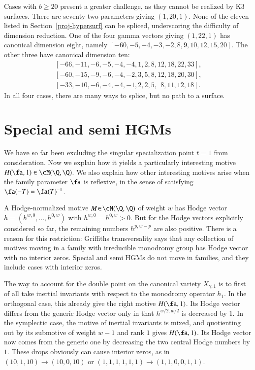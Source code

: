 \documentclass{notices}
\numberwithin{equation}{section}
\numberwithin{table}{section}
\numberwithin{figure}{section}
\begin{document}
{Cases with $b \geq 20$ present a greater 
challenge, as they cannot be realized by K3 surfaces. 
There are seventy-two parameters giving 
$(1,20,1)$.  None of the eleven 
listed in Section~\ref{proj-hypersurf} 
can be spliced, underscoring the
difficulty of dimension reduction.   
One of the four gamma vectors 
giving $(1,22,1)$ has canonical dimension
eight, namely $[-60, -5, -4, -3, -2, 8, 9, 10, 12, 15, 20]$.
The other three have canonical dimension
ten:
$$
\begin{array}{l}
\, [-66, -11, -6, -5, -4, -4, 1, 2, 8, 12, 18, 22, 33],\\
\,  [-60, -15, -9, -6, -4, -2, 3, 5, 8, 12, 18, 20, 30],\\
\, [-33, -10, -6, -4, -4, -1, 2, 2, 5, \; \, 8, 11, 12, 18].
\end{array}
$$
In all four cases, there are many ways to splice, but
no path to a surface.  





\section{Special and semi HGMs}
\label{special-motive}
We have so far been excluding the singular specialization point $t=1$ from consideration.
  Now we explain how it yields a particularly interesting 
  motive $H(\fa,1) \in \cM(\Q,\Q)$. 
We also explain how other interesting motives arise when the
family parameter $\fa$ is reflexive, in the sense of satisfying $\fa(-T)=\fa(T)^{-1}$.

 A Hodge-normalized motive $M \! \in \! \cM(\Q,\Q)$ of weight $w$
has Hodge vector $h = (h^{w,0},\dots,h^{0,w})$ with $h^{w,0}=h^{0,w}>0$.   
But for the Hodge vectors explicitly considered so far, the remaining
numbers $h^{p,w-p}$ are also positive.   There is a reason for this restriction: 
Griffiths transversality says that any collection of motives moving
in a family with irreducible monodromy group has Hodge vector with
no interior zeros.   Special and semi HGMs do not move in families,
and they include cases with interior zeros.  

  The way to account for the double point
on the canonical variety $X_{\gamma,1}$ is to first of all take
inertial invariants with respect to the monodromy operator 
$h_1$.  In the orthogonal case, this already give
the right motive $H(\fa,1)$.   Its Hodge vector
differs from the generic Hodge vector only in that
$h^{w/2,w/2}$ is decreased by $1$.   In the 
symplectic case, the motive of inertial invariants
is mixed, and quotienting out by its submotive
of weight $w-1$ and rank $1$ gives $H(\fa,1)$.  
Its Hodge vector now comes from the generic one
by decreasing the two central Hodge numbers by
$1$.   These drops obviously can cause interior
zeros, as in $(10,1,10) \rightarrow (10,0,10)$ 
or $(1,1,1,1,1,1) \rightarrow (1,1,0,0,1,1)$.  





}
\end{document}
